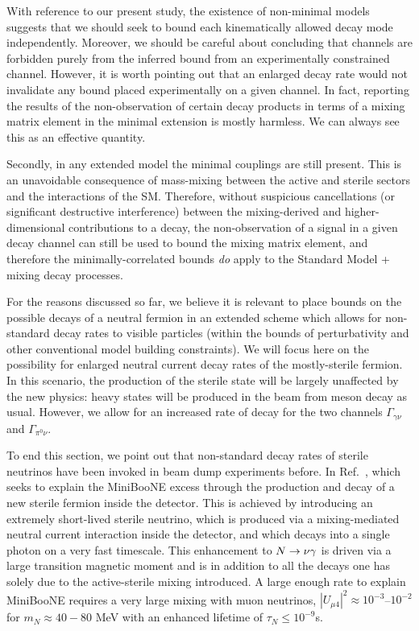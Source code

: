 \documentclass[11pt, a4paper]{article}
\newcommand{\refref}[1]{Ref.~\cite{#1}}
\def\ster{\ensuremath N}
\begin{document}
With reference to our present study, the existence of non-minimal models
suggests that we should seek to bound each kinematically allowed decay mode
independently. Moreover, we should be careful about concluding that channels
are forbidden purely from the inferred bound from an experimentally constrained
channel.  
%
However, it is worth pointing out that an enlarged decay rate would not
invalidate any bound placed experimentally on a given channel. In fact,
reporting the results of the non-observation of certain decay products in terms
of a mixing matrix element in the minimal extension is mostly harmless. We can
always see this as an effective quantity. 

Secondly, in any extended model the minimal couplings are still present. This
is an unavoidable consequence of mass-mixing between the active and sterile
sectors and the interactions of the SM. Therefore, without suspicious
cancellations (or significant destructive interference) between the
mixing-derived and higher-dimensional contributions to a decay, the
non-observation of a signal in a given decay channel can still be used to bound
the mixing matrix element, and therefore the minimally-correlated bounds
\emph{do} apply to the Standard Model + mixing decay processes. 

For the reasons discussed so far, we believe it is relevant to place bounds on
the possible decays of a neutral fermion in an extended scheme which allows for
non-standard decay rates to visible particles (within the bounds of perturbativity
and other conventional model building constraints).
%
We will focus here on the possibility for enlarged neutral current decay rates
of the mostly-sterile fermion. In this scenario, the production of the sterile
state will be largely unaffected by the new physics: heavy states will be
produced in the beam from meson decay as usual. However, we allow for an
increased rate of decay for the two channels $\Gamma_{\gamma\nu}$ and
$\Gamma_{\pi^0\nu}$. 

To end this section, we point out that non-standard decay rates of sterile
neutrinos have been invoked in beam dump experiments before. In
\refref{Gninenko:2009ks,Gninenko:2010pr}, which seeks to explain the MiniBooNE
excess through the production and decay of a new sterile fermion inside the
detector. This is achieved by introducing an extremely short-lived sterile
neutrino, which is produced via a mixing-mediated neutral current interaction
inside the detector, and which decays into a single photon on a very fast
timescale. This enhancement to $\ster\to \nu \gamma$ is driven via a large
transition magnetic moment and is in addition to all the decays one has solely
due to the active-sterile mixing introduced. A large enough rate to explain
MiniBooNE requires a very large mixing with muon neutrinos, $|U_{\mu 4}|^2
\approx 10^{-3}$--$10^{-2}$  for $m_N \approx 40-80$ MeV with an enhanced
lifetime of $\tau_N \leq 10^{-9}$s.
\end{document}
